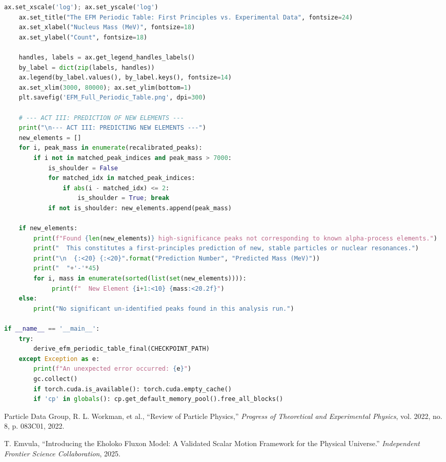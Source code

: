 \documentclass[11pt, twoside]{article}
\begin{document}
\begin{lstlisting}[language=Python, caption=EFM Definitive Periodic Table Derivation Engine (V30 FINAL - Corrected)]
    ax.set_xscale('log'); ax.set_yscale('log')
    ax.set_title("The EFM Periodic Table: First Principles vs. Experimental Data", fontsize=24)
    ax.set_xlabel("Nucleus Mass (MeV)", fontsize=18)
    ax.set_ylabel("Count", fontsize=18)
    
    handles, labels = ax.get_legend_handles_labels()
    by_label = dict(zip(labels, handles))
    ax.legend(by_label.values(), by_label.keys(), fontsize=14)
    ax.set_xlim(3000, 80000); ax.set_ylim(bottom=1)
    plt.savefig('EFM_Full_Periodic_Table.png', dpi=300)

    # --- ACT III: PREDICTION OF NEW ELEMENTS ---
    print("\n--- ACT III: PREDICTING NEW ELEMENTS ---")
    new_elements = []
    for i, peak_mass in enumerate(recalibrated_peaks):
        if i not in matched_peak_indices and peak_mass > 7000:
            is_shoulder = False
            for matched_idx in matched_peak_indices:
                if abs(i - matched_idx) <= 2: 
                    is_shoulder = True; break
            if not is_shoulder: new_elements.append(peak_mass)

    if new_elements:
        print(f"Found {len(new_elements)} high-significance peaks not corresponding to known alpha-process elements.")
        print("  This constitutes a first-principles prediction of new, stable particles or nuclear resonances.")
        print("\n  {:<20} {:<20}".format("Prediction Number", "Predicted Mass (MeV)"))
        print("  "+'-'*45)
        for i, mass in enumerate(sorted(list(set(new_elements)))):
             print(f"  New Element {i+1:<10} {mass:<20.2f}")
    else:
        print("No significant un-identified peaks found in this analysis run.")

if __name__ == '__main__':
    try:
        derive_efm_periodic_table_final(CHECKPOINT_PATH)
    except Exception as e:
        print(f"An unexpected error occurred: {e}")
        gc.collect()
        if torch.cuda.is_available(): torch.cuda.empty_cache()
        if 'cp' in globals(): cp.get_default_memory_pool().free_all_blocks()
\end{lstlisting}


\begin{thebibliography}{2}
\raggedright
{}
Particle Data Group, R. L. Workman, et al., ``Review of Particle Physics,'' \textit{Progress of Theoretical and Experimental Physics}, vol. 2022, no. 8, p. 083C01, 2022.

T. Emvula, ``Introducing the Eholoko Fluxon Model: A Validated Scalar Motion Framework for the Physical Universe.'' \textit{Independent Frontier Science Collaboration}, 2025.
\end{thebibliography}
\end{document}
